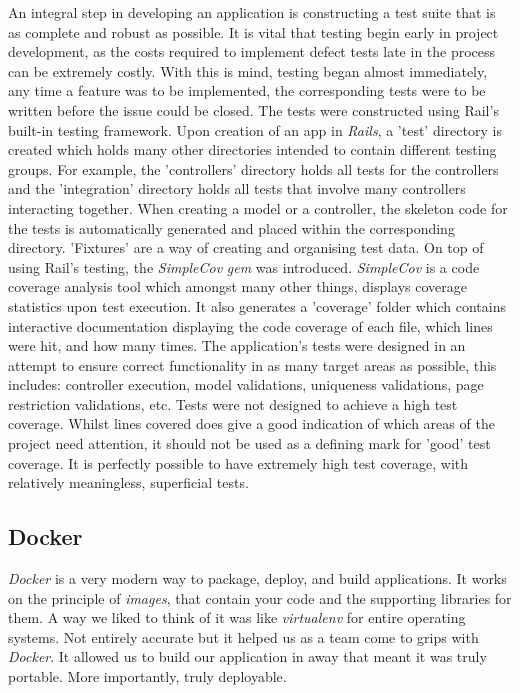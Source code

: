 \documentclass{l3proj}
\begin{document}
An integral step in developing an application is constructing a test suite that is as complete and robust as possible. It is vital that testing begin early in project development, as the costs required to implement defect tests late in the process can be extremely costly. With this is mind, testing began almost immediately, any time a feature was to be implemented, the corresponding tests were to be written before the issue could be closed. The tests were constructed using Rail's built-in testing framework. Upon creation of an app in \textit{Rails}, a 'test' directory is created which holds many other directories intended to contain different testing groups. For example, the 'controllers' directory holds all tests for the controllers and the 'integration' directory holds all tests that involve many controllers interacting together. When creating a model or a controller, the skeleton code for the tests is automatically generated and placed within the corresponding directory. 'Fixtures' are a way of creating and organising test data. On top of using Rail's testing, the \textit{SimpleCov} \textit{gem} was introduced. \textit{SimpleCov} is a code coverage analysis tool which amongst many other things, displays coverage statistics upon test execution. It also generates a 'coverage' folder which contains interactive documentation displaying the code coverage of each file, which lines were hit, and how many times. The application's tests were designed in an attempt to ensure correct functionality in as many target areas as possible, this includes: controller execution, model validations, uniqueness validations, page restriction validations, etc. Tests were not designed to achieve a high test coverage. Whilst lines covered does give a good indication of which areas of the project need attention, it should not be used as a defining mark for 'good' test coverage. It is perfectly possible to have extremely high test coverage, with relatively meaningless, superficial tests.


\subsection{Docker}
\label{sec:docker}

\textit{Docker} is a very modern way to package, deploy, and build applications. It works on the principle of \textit{images}, that contain your code and the supporting libraries for them. A way we liked to think of it was like \textit{virtualenv} for entire operating systems. Not entirely accurate but it helped us as a team come to grips with \textit{Docker}. It allowed us to build our application in away that meant it was truly portable. More importantly, truly deployable.
\end{document}
